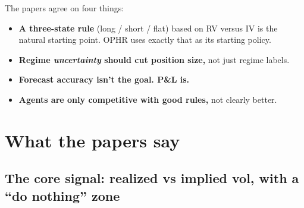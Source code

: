 \documentclass{article}
\begin{document}
The papers agree on four things:

\begin{itemize}

\item \textbf{A three-state rule} (long /\allowbreak{} short /\allowbreak{} flat) based on RV versus IV is the natural starting point. OPHR uses exactly that as its starting policy.

\item \textbf{Regime \emph{uncertainty} should cut position size,} not just regime labels.

\item \textbf{Forecast accuracy isn't the goal. P\&L is.}

\item \textbf{Agents are only competitive with good rules,} not clearly better.

\end{itemize}

\section{What the papers say}

\subsection{The core signal: realized vs implied vol, with a ``do nothing'' zone}
\end{document}
